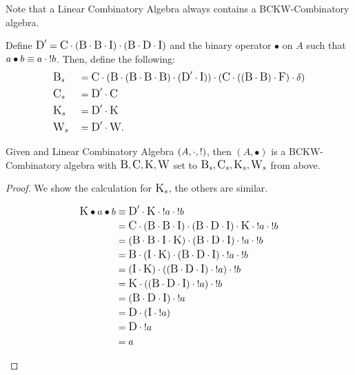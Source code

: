 Note that a Linear Combinatory Algebra always contains a BCKW-Combinatory algebra.

Define $\Dc' = \Cc\.(\Bc\.\Bc\.\Ic)\.(\Bc\.\Dc\.\Ic)$ and the binary operator $\bullet$ on $A$ such
that $a\bullet b \equiv a\.{!}b$. Then, define the following:
\begin{align*}
  &\Bc_s  &&=\Cc\.(\Bc\.(\Bc\.\Bc\.\Bc)\.(\Dc'\.\Ic))\.(\Cc\.((\Bc\.\Bc)\.\Fc)\.\dc)\\
  &\Cc_s  &&=\Dc'\.\Cc\\
  &\Kc_s  &&=\Dc'\.\Kc\\
  &\Wc_s  &&=\Dc'\.\Wc.
\end{align*}

\begin{lemma}\label{lem:linear_combinatory_algebra_has_a_bckw_algebra}
  Given and Linear Combinatory Algebra $(A,\.,{!})$, then $(A,\bullet)$ is a BCKW-Combinatory
  algebra with $\Bc,\Cc,\Kc,\Wc$ set to $\Bc_s,\Cc_s,\Kc_s,\Wc_s$ from above.
\end{lemma}
\begin{proof}
  We show the calculation for $\Kc_s$, the others are similar.
  \begin{singlespace}
    \begin{align*}
      \Kc\bullet a\bullet b &\equiv\Dc'\. \Kc \. {!}a \. {!}b\\
       &= \Cc\.(\Bc\.\Bc\.\Ic)\.(\Bc\.\Dc\.\Ic)\. \Kc \. {!}a \. {!}b\\
       &= (\Bc\.\Bc\.\Ic\. \Kc)\.(\Bc\.\Dc\.\Ic) \. {!}a \. {!}b\\
       &= \Bc\.(\Ic\. \Kc)\.(\Bc\.\Dc\.\Ic) \. {!}a \. {!}b\\
       &= (\Ic\. \Kc)\.((\Bc\.\Dc\.\Ic) \. {!}a) \. {!}b\\
       &= \Kc\.((\Bc\.\Dc\.\Ic) \. {!}a) \. {!}b\\
       &= (\Bc\.\Dc\.\Ic) \. {!}a\\
       &= \Dc\.(\Ic \. {!}a)\\
       &= \Dc\. {!}a\\
       &= a\\
    \end{align*}
  \end{singlespace}
  
\end{proof}




























